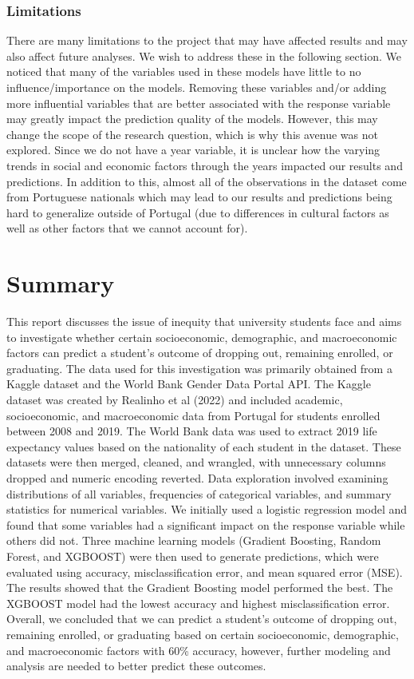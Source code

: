 \documentclass[
]{article}
\begin{document}
\hypertarget{limitations}{%
\subsubsection{Limitations}\label{limitations}}

There are many limitations to the project that may have affected results
and may also affect future analyses. We wish to address these in the
following section. We noticed that many of the variables used in these
models have little to no influence/importance on the models. Removing
these variables and/or adding more influential variables that are better
associated with the response variable may greatly impact the prediction
quality of the models. However, this may change the scope of the
research question, which is why this avenue was not explored. Since we
do not have a year variable, it is unclear how the varying trends in
social and economic factors through the years impacted our results and
predictions. In addition to this, almost all of the observations in the
dataset come from Portuguese nationals which may lead to our results and
predictions being hard to generalize outside of Portugal (due to
differences in cultural factors as well as other factors that we cannot
account for).

\hypertarget{summary}{%
\section{Summary}\label{summary}}

This report discusses the issue of inequity that university students
face and aims to investigate whether certain socioeconomic, demographic,
and macroeconomic factors can predict a student's outcome of dropping
out, remaining enrolled, or graduating. The data used for this
investigation was primarily obtained from a Kaggle dataset and the World
Bank Gender Data Portal API. The Kaggle dataset was created by Realinho
et al (2022) and included academic, socioeconomic, and macroeconomic
data from Portugal for students enrolled between 2008 and 2019. The
World Bank data was used to extract 2019 life expectancy values based on
the nationality of each student in the dataset. These datasets were then
merged, cleaned, and wrangled, with unnecessary columns dropped and
numeric encoding reverted. Data exploration involved examining
distributions of all variables, frequencies of categorical variables,
and summary statistics for numerical variables. We initially used a
logistic regression model and found that some variables had a
significant impact on the response variable while others did not. Three
machine learning models (Gradient Boosting, Random Forest, and XGBOOST)
were then used to generate predictions, which were evaluated using
accuracy, misclassification error, and mean squared error (MSE). The
results showed that the Gradient Boosting model performed the best. The
XGBOOST model had the lowest accuracy and highest misclassification
error. Overall, we concluded that we can predict a student's outcome of
dropping out, remaining enrolled, or graduating based on certain
socioeconomic, demographic, and macroeconomic factors with 60\%
accuracy, however, further modeling and analysis are needed to better
predict these outcomes.
\end{document}
